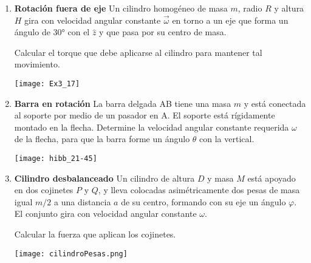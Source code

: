 \documentclass[11pt, spanish, a4paper, twoside]{article}
\begin{document}
\begin{enumerate}
	\item
	\begin{minipage}[t][3cm]{0.75\textwidth}
		\textbf{Rotación fuera de eje}
		Un cilindro homogéneo de masa \(m\), radio \(R\) y altura \(H\) gira con velocidad angular constante \(\vec{\omega}\) en torno a un eje que forma un ángulo de \ang{30;;} con el \(\hat{z}\) y que pasa por su centro de masa.
		\begin{tasks}
			\task Calcular el torque que debe aplicarse al cilindro para mantener tal movimiento.
		\end{tasks}
	\end{minipage}
	\begin{minipage}[c][2cm][t]{0.2\textwidth}
		\texttt{[image: Ex3\_17]}
	\end{minipage}


	\item 
	\begin{minipage}[t][4.5cm]{0.75\textwidth}
		\textbf{Barra en rotación}
		La barra delgada AB tiene una masa \(m\) y está conectada al soporte por medio de un pasador en A.
		El soporte está rígidamente montado en la flecha.
		Determine la velocidad angular constante requerida \(\omega\) de la flecha, para que la barra forme un ángulo \(\theta\) con la vertical.
	\end{minipage}
	\begin{minipage}[c][3cm][t]{0.2\textwidth}
		\texttt{[image: hibb\_21-45]}
	\end{minipage}


	\item 
	\begin{minipage}[t][3.5cm]{0.6\textwidth}
	\textbf{Cilindro desbalanceado}
		Un cilindro de altura \(D\) y masa \(M\) está apoyado en dos cojinetes \(P\) y \(Q\), y lleva colocadas asimétricamente dos pesas de masa igual \(m/2\) a una distancia \(a\) de su centro, formando con su eje un ángulo \(\varphi\).
		El conjunto gira con velocidad angular constante \(\omega\).
		\begin{tasks} 
			\task Calcular la fuerza que aplican los cojinetes.
		\end{tasks}
	\end{minipage}
	\begin{minipage}[c][0.5cm][t]{0.35\textwidth}
		\texttt{[image: cilindroPesas.png]}
	\end{minipage}
	
	


\end{enumerate}
\end{document}
